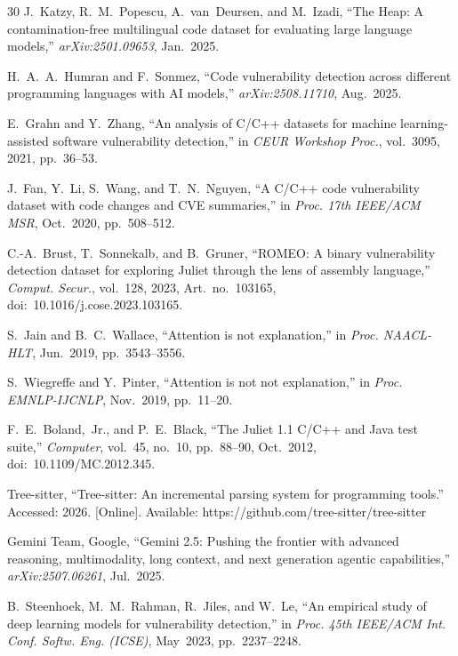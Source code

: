 \documentclass{ieeeaccess}
\begin{document}
\begin{thebibliography}{30}
 J.~Katzy, R.~M.~Popescu, A.~van~Deursen, and M.~Izadi, ``The Heap: A contamination-free multilingual code dataset for evaluating large language models,'' \emph{arXiv:2501.09653}, Jan.~2025.

 H.~A.~A.~Humran and F.~Sonmez, ``Code vulnerability detection across different programming languages with AI models,'' \emph{arXiv:2508.11710}, Aug.~2025.

 E.~Grahn and Y.~Zhang, ``An analysis of C/C++ datasets for machine learning-assisted software vulnerability detection,'' in \emph{CEUR Workshop Proc.}, vol.~3095, 2021, pp.~36--53.

 J.~Fan, Y.~Li, S.~Wang, and T.~N.~Nguyen, ``A C/C++ code vulnerability dataset with code changes and CVE summaries,'' in \emph{Proc. 17th IEEE/ACM MSR}, Oct.~2020, pp.~508--512.

 C.-A.~Brust, T.~Sonnekalb, and B.~Gruner, ``ROMEO: A binary vulnerability detection dataset for exploring Juliet through the lens of assembly language,'' \emph{Comput. Secur.}, vol.~128, 2023, Art.~no.~103165, doi:~10.1016/j.cose.2023.103165.

 S.~Jain and B.~C.~Wallace, ``Attention is not explanation,'' in \emph{Proc. NAACL-HLT}, Jun.~2019, pp.~3543--3556.

 S.~Wiegreffe and Y.~Pinter, ``Attention is not not explanation,'' in \emph{Proc. EMNLP-IJCNLP}, Nov.~2019, pp.~11--20.

 F.~E.~Boland,~Jr., and P.~E.~Black, ``The Juliet 1.1 C/C++ and Java test suite,'' \emph{Computer}, vol.~45, no.~10, pp.~88--90, Oct.~2012, doi:~10.1109/MC.2012.345.

 Tree-sitter, ``Tree-sitter: An incremental parsing system for programming tools.'' Accessed: 2026. [Online]. Available: https://github.com/tree-sitter/tree-sitter

 Gemini Team, Google, ``Gemini 2.5: Pushing the frontier with advanced reasoning, multimodality, long context, and next generation agentic capabilities,'' \emph{arXiv:2507.06261}, Jul.~2025.

 B.~Steenhoek, M.~M.~Rahman, R.~Jiles, and W.~Le, ``An empirical study of deep learning models for vulnerability detection,'' in \emph{Proc. 45th IEEE/ACM Int. Conf. Softw. Eng. (ICSE)}, May~2023, pp.~2237--2248.

\end{thebibliography}
\end{document}
